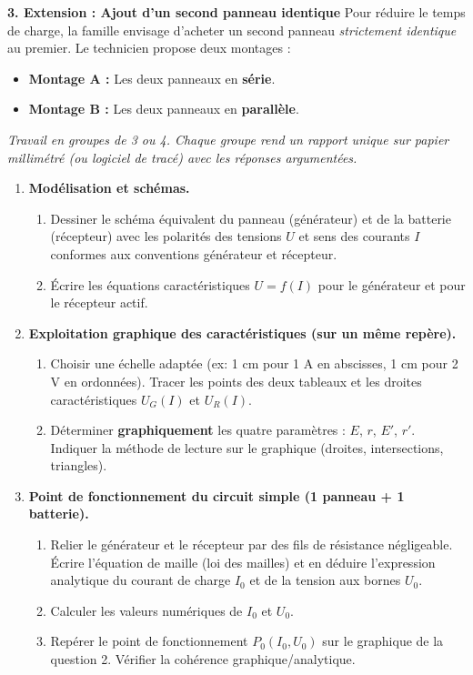\documentclass[11pt]{article}
\newcommand{\cle}[1]{{\popxbold\color{popdark}#1}}
\newcounter{popsec}
\newcounter{popsub}
\newcommand{\courssub}[1]{%
  \stepcounter{popsub}%
  \par\vspace{9pt}\noindent{\popxbold\fontsize{11.5}{13}\selectfont\color{popink}{\color{poporange}\thepopsec.\thepopsub}\hspace{6pt}#1}\par\nopagebreak\vspace{4pt}
}
\begin{document}
\medskip
\textbf{3. Extension : Ajout d'un second panneau identique}
Pour réduire le temps de charge, la famille envisage d'acheter un second panneau \emph{strictement identique} au premier. Le technicien propose deux montages :
\begin{itemize}
    \item \textbf{Montage A :} Les deux panneaux en \textbf{série}.
    \item \textbf{Montage B :} Les deux panneaux en \textbf{parallèle}.
\end{itemize}

\courssub{Consignes}
\emph{Travail en groupes de 3 ou 4. Chaque groupe rend un rapport unique sur papier millimétré (ou logiciel de tracé) avec les réponses argumentées.}

\begin{enumerate}
    \item \textbf{Modélisation et schémas.}
    \begin{enumerate}
        \item Dessiner le schéma équivalent du panneau (générateur) et de la batterie (récepteur) avec les polarités des tensions \cle{$U$} et sens des courants \cle{$I$} conformes aux conventions générateur et récepteur.
        \item Écrire les équations caractéristiques \cle{$U = f(I)$} pour le générateur et pour le récepteur actif.
    \end{enumerate}

    \item \textbf{Exploitation graphique des caractéristiques (sur un même repère).}
    \begin{enumerate}
        \item Choisir une échelle adaptée (ex: 1 cm pour 1 A en abscisses, 1 cm pour 2 V en ordonnées). Tracer les points des deux tableaux et les droites caractéristiques \cle{$U_G(I)$} et \cle{$U_R(I)$}.
        \item Déterminer \textbf{graphiquement} les quatre paramètres : \cle{$E$}, \cle{$r$}, \cle{$E'$}, \cle{$r'$}. Indiquer la méthode de lecture sur le graphique (droites, intersections, triangles).
    \end{enumerate}

    \item \textbf{Point de fonctionnement du circuit simple (1 panneau + 1 batterie).}
    \begin{enumerate}
        \item Relier le générateur et le récepteur par des fils de résistance négligeable. Écrire l'équation de maille (loi des mailles) et en déduire l'expression analytique du courant de charge \cle{$I_0$} et de la tension aux bornes \cle{$U_0$}.
        \item Calculer les valeurs numériques de \cle{$I_0$} et \cle{$U_0$}.
        \item Repérer le point de fonctionnement \cle{$P_0(I_0, U_0)$} sur le graphique de la question 2. Vérifier la cohérence graphique/analytique.
    \end{enumerate}


\end{enumerate}
\end{document}
